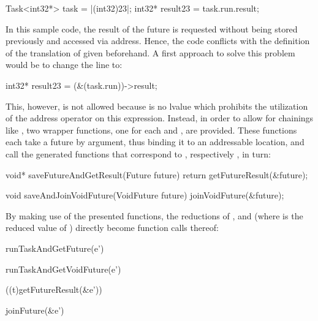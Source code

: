 \begin{ccode}
Task<int32*> task = |(int32)23|;
int32* result23 = task.run.result;
\end{ccode}

In this sample code, the result of the future is requested without being stored previously and accessed via address. Hence, the code conflicts with the definition of the translation of  given beforehand. A first approach to solve this problem would be to change the line to:

\begin{ccode}
int32* result23 = (&(task.run))->result;
\end{ccode}

This, however, is not allowed because  is no lvalue \cite[pp.~147-148]{CPrimerPlus} which prohibits the utilization of the address operator on this expression. Instead, in order to allow for chainings like , two wrapper functions, one for each  and , are provided. These functions each take a future by argument, thus binding it to an addressable location, and call the generated functions that correspond to , respectively , in turn:
\begin{ccode}
void* saveFutureAndGetResult(Future future) { 
  return getFutureResult(&future); 
}

void saveAndJoinVoidFuture(VoidFuture future) { 
  joinVoidFuture(&future); 
}
\end{ccode}

By making use of the presented functions, the reductions of ,  and  (where  is the reduced value of ) directly become function calls thereof:

\begin{minipage}{0.5\textwidth}
\begin{ccode}
runTaskAndGetFuture(e')
\end{ccode}
\end{minipage}
\begin{minipage}{0.5\textwidth}
\begin{ccode}
runTaskAndGetVoidFuture(e')
\end{ccode}
\end{minipage}

\begin{minipage}{0.5\textwidth}
\begin{ccode}
((t)getFutureResult(&e'))
\end{ccode}
\end{minipage}
\begin{minipage}{0.5\textwidth}
\begin{ccode}
joinFuture(&e')
\end{ccode}
\end{minipage}

